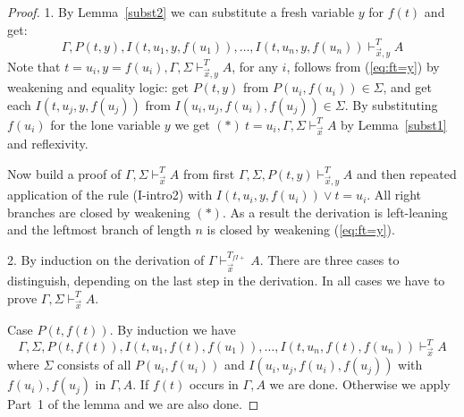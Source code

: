 \documentclass{fundam}
\begin{document}
\begin{proof}
1. By Lemma~\ref{subst2} we can substitute a fresh variable $y$ for $f(t)$ and get:
\begin{equation}\label{eq:ft=y}
\Gamma,P(t,y),  I(t,u_1,y,f(u_1)),\ldots,I(t,u_n,y,f(u_n))\vdash_{\vec{x},y}^{T} A
\end{equation}
Note that $t=u_i,y=f(u_i),\Gamma,\Sigma\vdash_{\vec{x},y}^{T} A$,
for any $i$, follows from (\ref{eq:ft=y}) by weakening and equality logic:
get $P(t,y)$ from $P(u_i,f(u_i))\in\Sigma$, and get each $I(t,u_j,y,f(u_j))$ 
from $I(u_i,u_j,f(u_i),f(u_j))\in\Sigma$. 
By substituting $f(u_i)$ for the
lone variable $y$ we get $(\ast)~t=u_i,\Gamma,\Sigma\vdash_{\vec{x}}^{T} A$
by Lemma~\ref{subst1} and reflexivity.

Now build a proof of $\Gamma,\Sigma\vdash_{\vec{x}}^{T} A$ from first 
$\Gamma,\Sigma,P(t,y)\vdash_{\vec{x},y}^{T} A$ and then repeated
application of the rule (I-intro2) with $I(t,u_i,y,f(u_i)) \lor t=u_i$. 
All right branches are closed by weakening  $(\ast)$. As a result the derivation
is left-leaning and the leftmost branch of length $n$ is closed by
weakening (\ref{eq:ft=y}).

2. By induction on the derivation of $\Gamma\vdash_{\vec{x}}^{T_{f\!I\!{+}}} A$.
There are three cases to distinguish, depending on the last step in the derivation.
In all cases we have to prove $\Gamma,\Sigma\vdash_{\vec{x}}^{T} A$.

Case $P(t,f(t))$. By induction we have 
\begin{equation}\label{ih:Ptft}
\Gamma,\Sigma,P(t,f(t)), I(t,u_1,f(t),f(u_1)),\ldots,I(t,u_n,f(t),f(u_n))\vdash_{\vec{x}}^{T} A
\end{equation}
where $\Sigma$ consists of all $P(u_i,f(u_i))$ and $I(u_i,u_j,f(u_i),f(u_j))$
with $f(u_i),f(u_j)$ in $\Gamma,A$. 
If $f(t)$ occurs in $\Gamma,A$ we are done.
Otherwise we apply Part~1 of the lemma and we are also done.


\end{proof}
\end{document}
